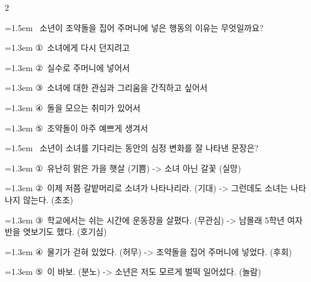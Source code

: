 \documentclass[11pt, a4paper]{article}
\begin{document}
\begin{multicols}{2}
\noindent\begin{minipage}{\columnwidth}
\vspace{2mm}
{\hangindent=1.5em  ~소년이 조약돌을 집어 주머니에 넣은 행동의 이유는 무엇일까요?\par}

\vspace{0.5mm}
{\hangindent=1.3em  \noindent\hspace{0.3em}①~소녀에게 다시 던지려고\par}
{\hangindent=1.3em  \noindent\hspace{0.3em}②~실수로 주머니에 넣어서\par}
{\hangindent=1.3em  \noindent\hspace{0.3em}③~소녀에 대한 관심과 그리움을 간직하고 싶어서\par}
{\hangindent=1.3em  \noindent\hspace{0.3em}④~돌을 모으는 취미가 있어서\par}
{\hangindent=1.3em  \noindent\hspace{0.3em}⑤~조약돌이 아주 예쁘게 생겨서\par}
\vspace{4mm}
\end{minipage}
\par

\noindent\begin{minipage}{\columnwidth}
\vspace{2mm}
{\hangindent=1.5em  ~소년이 소녀를 기다리는 동안의 심정 변화를 잘 나타낸 문장은?\par}

\vspace{0.5mm}
{\hangindent=1.3em  \noindent\hspace{0.3em}①~유난히 맑은 가을 햇살 (기쁨) -> 소녀 아닌 갈꽃 (실망)\par}
{\hangindent=1.3em  \noindent\hspace{0.3em}②~이제 저쯤 갈밭머리로 소녀가 나타나리라. (기대) -> 그런데도 소녀는 나타나지 않는다. (초조)\par}
{\hangindent=1.3em  \noindent\hspace{0.3em}③~학교에서는 쉬는 시간에 운동장을 살폈다. (무관심) -> 남몰래 5학년 여자 반을 엿보기도 했다. (호기심)\par}
{\hangindent=1.3em  \noindent\hspace{0.3em}④~물기가 걷혀 있었다. (허무) -> 조약돌을 집어 주머니에 넣었다. (후회)\par}
{\hangindent=1.3em  \noindent\hspace{0.3em}⑤~이 바보. (분노) -> 소년은 저도 모르게 벌떡 일어섰다. (놀람)\par}
\vspace{4mm}
\end{minipage}
\par


\end{multicols}
\end{document}
